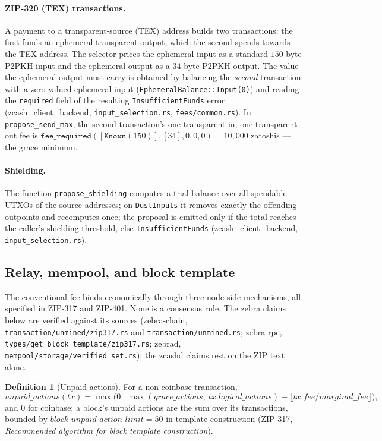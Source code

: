 \documentclass[11pt,a4paper]{article}
\theoremstyle{definition}
\newtheorem{definition}[theorem]{Definition}
\begin{document}
\paragraph{ZIP-320 (TEX) transactions.} A payment to a transparent-source
(TEX) address builds two transactions: the first funds an ephemeral
transparent output, which the second spends towards the TEX address. The
selector prices the ephemeral input as a standard $150$-byte P2PKH input
and the ephemeral output as a $34$-byte P2PKH output. The value the
ephemeral output must carry is obtained by balancing the \emph{second}
transaction with a zero-valued ephemeral input
(\texttt{EphemeralBalance::Input(0)}) and reading the \texttt{required}
field of the resulting \texttt{InsufficientFunds} error
(\textsf{zcash\_client\_backend}, \texttt{input\_selection.rs},
\texttt{fees/common.rs}). In \texttt{propose\_send\_max}, the second
transaction's one-transparent-in, one-transparent-out fee is
$\texttt{fee\_required}([\texttt{Known}(150)], [34], 0, 0, 0) = 10{,}000$
zatoshis --- the grace minimum.

\paragraph{Shielding.} The function \texttt{propose\_shielding} computes a
trial balance over all spendable UTXOs of the source addresses; on
\texttt{DustInputs} it removes exactly the offending outpoints and
recomputes once; the proposal is emitted only if the total reaches the
caller's shielding threshold, else \texttt{InsufficientFunds}
(\textsf{zcash\_client\_backend}, \texttt{input\_selection.rs}).

\subsection{Relay, mempool, and block template}\label{sec:fees-network}

The conventional fee binds economically through three node-side mechanisms,
all specified in ZIP-317 and ZIP-401. None is a consensus rule. The
\textsf{zebra} claims below are verified against its sources
(\textsf{zebra-chain}, \texttt{transaction/unmined/zip317.rs} and
\texttt{transaction/unmined.rs}; \textsf{zebra-rpc},
\texttt{types/get\_block\_template/zip317.rs}; \textsf{zebrad},
\texttt{mempool/storage/verified\_set.rs}); the \textsf{zcashd} claims
rest on the ZIP text alone.

\begin{definition}[Unpaid actions]\label{def:unpaid-actions}
For a non-coinbase transaction,
\[
\mathit{unpaid\_actions}(tx) = \max\bigl(0,\
\max(\mathit{grace\_actions},\ tx.\mathit{logical\_actions})
- \lfloor tx.\mathit{fee} / \mathit{marginal\_fee} \rfloor\bigr),
\]
and $0$ for coinbase; a block's unpaid actions are the sum over its
transactions, bounded by
$\mathit{block\_unpaid\_action\_limit} = 50$ in template construction
(ZIP-317, \emph{Recommended algorithm for block template construction}).
\end{definition}
\end{document}
